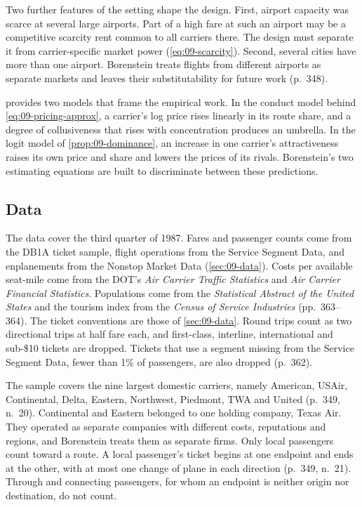 Two further features of the setting shape the design. First, airport capacity was scarce at several large
airports. Part of a high fare at such an airport may be a competitive scarcity rent common to all carriers
there. The design must separate it from carrier-specific market power (\cref{eq:09-scarcity}). Second,
several cities have more than one airport. Borenstein treats flights from different airports as separate
markets and leaves their substitutability for future work (p.~348).

 provides two models that frame the empirical work. In the conduct model behind
\cref{eq:09-pricing-approx}, a carrier's log price rises linearly in its route share, and a degree of
collusiveness that rises with concentration produces an umbrella. In the logit model of
\cref{prop:09-dominance}, an increase in one carrier's attractiveness raises its own price and share and lowers
the prices of its rivals. Borenstein's two estimating equations are built to discriminate between these
predictions.

\subsection{Data}\label{sec:09-bor-data}

 The data cover the third quarter of 1987. Fares and passenger counts come from
the DB1A ticket sample, flight operations from the Service Segment Data, and enplanements from the Nonstop
Market Data (\cref{sec:09-data}). Costs per available seat-mile come from the DOT's \emph{Air Carrier Traffic
Statistics} and \emph{Air Carrier Financial Statistics}. Populations come from the \emph{Statistical Abstract of
the United States} and the tourism index from the \emph{Census of Service Industries} (pp.~363--364). The ticket
conventions are those of \cref{sec:09-data}. Round trips count as two directional trips at half fare each, and
first-class, interline, international and sub-\$10 tickets are dropped. Tickets that use a segment missing from
the Service Segment Data, fewer than 1\% of passengers, are also dropped (p.~362).

The sample covers the nine largest domestic carriers, namely American, USAir, Continental, Delta, Eastern,
Northwest, Piedmont, TWA and United (p.~349, n.~20). Continental and Eastern belonged to one holding company,
Texas Air. They operated as separate companies with different costs, reputations and regions, and Borenstein
treats them as separate firms. Only local passengers count toward a route. A local passenger's ticket begins
at one endpoint and ends at the other, with at most one change of plane in each direction (p.~349, n.~21).
Through and connecting passengers, for whom an endpoint is neither origin nor destination, do not count.


